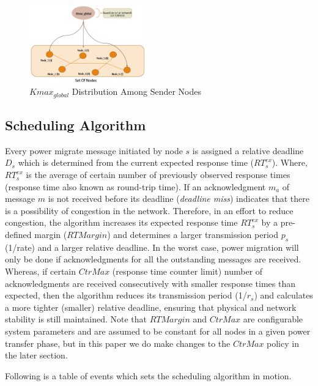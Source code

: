 \begin{figure}[htb]
  \begin{center}
    \includegraphics[width=0.45\textwidth]{Figures/kmax_distri.png}
  \caption{$Kmax_{global}$ Distribution Among Sender Nodes}
  \label{fig:Kmax_distribution}
  \end{center}
\end{figure}

\subsection{Scheduling Algorithm}
\label{sec:sched_algo_explanation} 

Every power migrate message initiated by node $s$ is assigned a relative deadline $D_s$ which is determined 
from the current expected response time ($RT_s^{ex}$). Where, $RT_s^{ex}$ is the average of certain number 
of previously observed response times (response time also known as round-trip time). If an acknowledgment 
$m_a$ of message $m$ is not received before its deadline (\textit{deadline miss}) indicates that there 
is a possibility of congestion in the network. Therefore, in an effort to reduce congestion, the algorithm 
increases its expected response time $RT_s^{ex}$ by a pre-defined margin ($RTMargin$) and determines a 
larger transmission period $p_s$ (1/rate) and a larger relative deadline. In the worst case, power migration will only 
be done if acknowledgments for all the outstanding messages are received. Whereas, if certain $CtrMax$ 
(response time counter limit) number of acknowledgments are received consecutively with smaller response 
times than expected, then the algorithm reduces its transmission period (1/$r_s$) and calculates a more tighter 
(smaller) relative deadline, ensuring that physical and network stability is still maintained. Note that 
$RTMargin$ and $CtrMax$ are configurable system parameters and are assumed to be constant for all nodes 
in a given power transfer phase, but in this paper we do make changes to the $CtrMax$ policy in the later 
section. 

Following is a table of events which sets the scheduling algorithm in motion.\\

